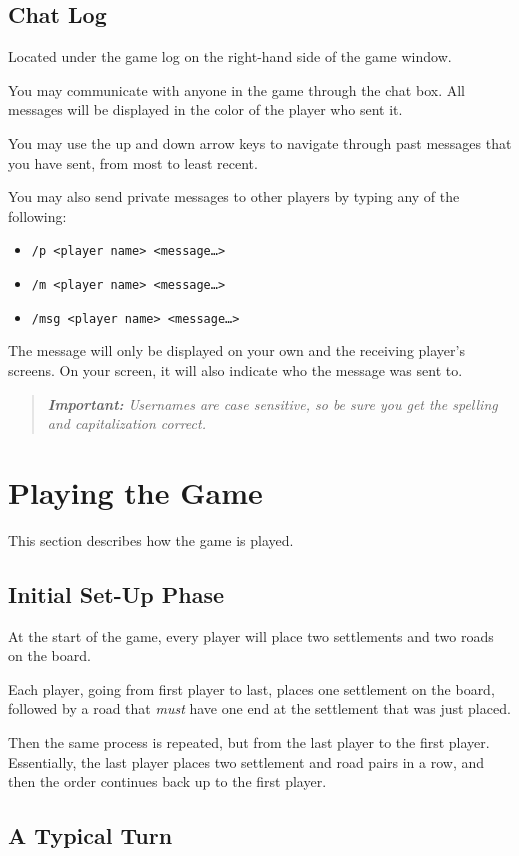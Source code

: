 \documentclass[12pt,letterpaper,titlepage]{article}
\newcommand\note[1]{\begin{quote}\emph{\textbf{Important:} #1}\end{quote}}
\begin{document}
	\subsection{Chat Log}
	Located under the game log on the right-hand side of the game window.
	
	You may communicate with anyone in the game through the chat box. All messages will be displayed in the color of the player who sent it.
	
	You may use the up and down arrow keys to navigate through past messages that you have sent, from most to least recent.
	
	You may also send private messages to other players by typing any of the following:
	\begin{itemize}
	\item \texttt{/p <player name> <message…>}
	\item \texttt{/m <player name> <message…>}
	\item \texttt{/msg <player name> <message…>}
	\end{itemize}
	The message will only be displayed on your own and the receiving player's screens. On your screen, it will also indicate who the message was sent to.
	
	\note{Usernames are case sensitive, so be sure you get the spelling and capitalization correct.}

\section{Playing the Game}
This section describes how the game is played.
	\subsection{Initial Set-Up Phase}
	At the start of the game, every player will place two settlements and two roads on the board.
	
	Each player, going from first player to last, places one settlement on the board, followed by a road that \emph{must} have one end at the settlement that was just placed.
	
	Then the same process is repeated, but from the last player to the first player. Essentially, the last player places two settlement and road pairs in a row, and then the order continues back up to the first player.
	
	\subsection{A Typical Turn}
\end{document}
